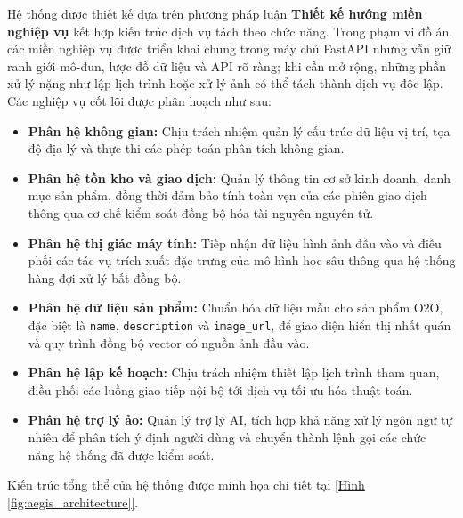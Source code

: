 \documentclass[12pt, a4paper]{article}
\begin{document}
Hệ thống được thiết kế dựa trên phương pháp luận \textbf{Thiết kế hướng miền nghiệp vụ} kết hợp kiến trúc dịch vụ tách theo chức năng. Trong phạm vi đồ án, các miền nghiệp vụ được triển khai chung trong máy chủ FastAPI nhưng vẫn giữ ranh giới mô-đun, lược đồ dữ liệu và API rõ ràng; khi cần mở rộng, những phần xử lý nặng như lập lịch trình hoặc xử lý ảnh có thể tách thành dịch vụ độc lập. Các nghiệp vụ cốt lõi được phân hoạch như sau:

\begin{itemize}
    \item \textbf{Phân hệ không gian:} Chịu trách nhiệm quản lý cấu trúc dữ liệu vị trí, tọa độ địa lý và thực thi các phép toán phân tích không gian.
    
    \item \textbf{Phân hệ tồn kho và giao dịch:} Quản lý thông tin cơ sở kinh doanh, danh mục sản phẩm, đồng thời đảm bảo tính toàn vẹn của các phiên giao dịch thông qua cơ chế kiểm soát đồng bộ hóa tài nguyên nguyên tử.
    
    \item \textbf{Phân hệ thị giác máy tính:} Tiếp nhận dữ liệu hình ảnh đầu vào và điều phối các tác vụ trích xuất đặc trưng của mô hình học sâu thông qua hệ thống hàng đợi xử lý bất đồng bộ.

    \item \textbf{Phân hệ dữ liệu sản phẩm:} Chuẩn hóa dữ liệu mẫu cho sản phẩm O2O, đặc biệt là \texttt{name}, \texttt{description} và \texttt{image\_url}, để giao diện hiển thị nhất quán và quy trình đồng bộ vector có nguồn ảnh đầu vào.
    
    \item \textbf{Phân hệ lập kế hoạch:} Chịu trách nhiệm thiết lập lịch trình tham quan, điều phối các luồng giao tiếp nội bộ tới dịch vụ tối ưu hóa thuật toán.
    
    \item \textbf{Phân hệ trợ lý ảo:} Quản lý trợ lý AI, tích hợp khả năng xử lý ngôn ngữ tự nhiên để phân tích ý định người dùng và chuyển thành lệnh gọi các chức năng hệ thống đã được kiểm soát.
\end{itemize}

Kiến trúc tổng thể của hệ thống được minh họa chi tiết tại \hyperref[fig:aegis_architecture]{[Hình \ref*{fig:aegis_architecture}]}.
\end{document}
